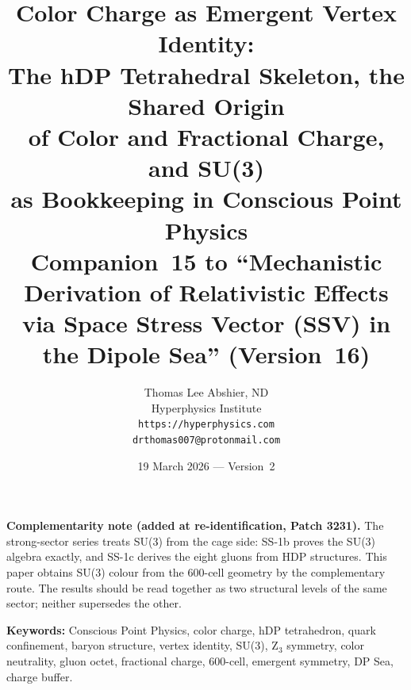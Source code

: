 \documentclass[12pt]{article}
\title{\textbf{Color Charge as Emergent Vertex Identity:\\
The hDP Tetrahedral Skeleton, the Shared Origin\\
of Color and Fractional Charge, and SU(3)\\
as Bookkeeping in Conscious Point Physics}\\[6pt]
{\large Companion~15 to ``Mechanistic Derivation of Relativistic Effects\\
via Space Stress Vector (SSV) in the Dipole Sea'' (Version~16)}}
\author{Thomas Lee Abshier, ND\\
Hyperphysics Institute\\
\texttt{https://hyperphysics.com}\\
\texttt{drthomas007@protonmail.com}}
\date{19 March 2026 --- Version~2}
\begin{document}
\maketitle

\noindent\textbf{Complementarity note (added at re-identification,
Patch 3231).} The strong-sector series treats SU(3) from the cage side:
SS-1b proves the SU(3) algebra exactly, and SS-1c derives the eight
gluons from HDP structures. This paper obtains SU(3) colour from the
600-cell geometry by the complementary route. The results should be
read together as two structural levels of the same sector; neither
supersedes the other.


\noindent\textbf{Keywords:} Conscious Point Physics, color charge,
hDP tetrahedron, quark confinement, baryon structure, vertex identity,
SU(3), Z$_3$ symmetry, color neutrality, gluon octet, fractional
charge, 600-cell, emergent symmetry, DP Sea, charge buffer.
\end{document}
